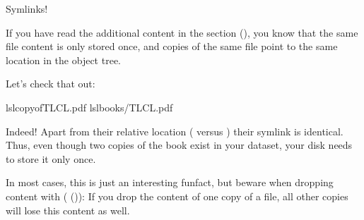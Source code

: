 \ignorespaces \begin{findoutmore}[label={index-5}, before title={\thetcbcounter\ }, check odd page=true]{Symlinks!}
\label{\detokenize{basics/101-136-filesystem:index-5}}

\sphinxAtStartPar
If you have read the additional content in the section
{\hyperref[\detokenize{basics/101-115-symlinks:symlink}]{}} (), you know that the same file content
is only stored once, and copies of the same file point to
the same location in the object tree.

\sphinxAtStartPar
Let’s check that out:

\begin{sphinxVerbatim}[commandchars=\\\{\}]
ls\PYGZhy{}lcopyofTLCL.pdf
ls\PYGZhy{}lbooks/TLCL.pdf
\end{sphinxVerbatim}

\sphinxAtStartPar
Indeed! Apart from their relative location ( versus
) their symlink is identical. Thus, even though two
copies of the book exist in your dataset, your disk needs to
store it only once.

\sphinxAtStartPar
In most cases, this is just an interesting fun\sphinxhyphen{}fact, but beware
when dropping content with 
({\hyperref[\detokenize{basics/101-136-filesystem:remove}]{}} ()):
If you drop the content of one copy of a file, all
other copies will lose this content as well.


\end{findoutmore}

